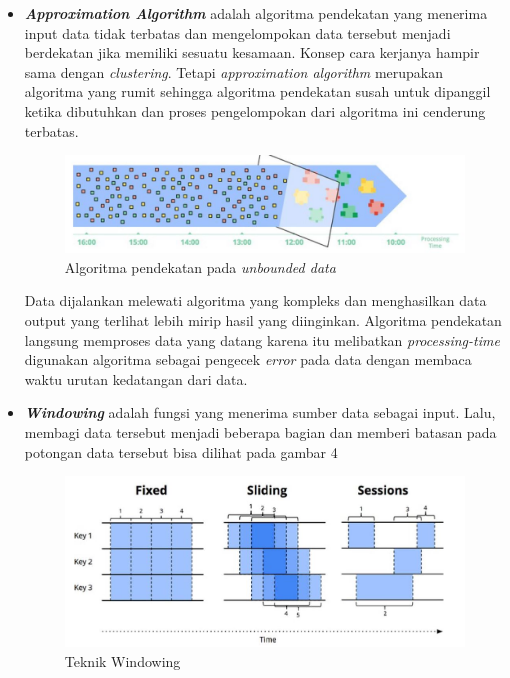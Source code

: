 \documentclass[a4paper,twoside]{article}
\begin{document}
\begin{enumerate}
\begin{itemize}
			
			\item{\textbf{\textit{Approximation Algorithm}} adalah algoritma pendekatan yang 						menerima input data tidak terbatas dan mengelompokan data tersebut menjadi berdekatan 					jika memiliki sesuatu kesamaan. Konsep cara kerjanya hampir sama dengan 								\textit{clustering}. Tetapi \textit{approximation algorithm} merupakan algoritma 						yang rumit sehingga algoritma pendekatan susah untuk dipanggil ketika dibutuhkan dan 					proses pengelompokan dari algoritma ini cenderung terbatas.
			
			\begin{figure}[H] 
			\centering  
			\includegraphics[scale=0.5]{5-approximation-algorithm}  
			\caption[Gambar {\it approximation-algorithm}]{Algoritma pendekatan pada 								\textit{unbounded data}} 
			\label{fig:processing-events relationship} 
			\end{figure} 
			
			Data dijalankan melewati algoritma yang kompleks dan menghasilkan data output yang 						terlihat lebih mirip hasil yang diinginkan. Algoritma pendekatan langsung memproses data 			yang datang karena itu melibatkan \textit{processing-time} digunakan algoritma sebagai 					pengecek \textit{error} pada data dengan membaca waktu urutan kedatangan dari data.
			}
			
			
			\item{\textbf{\textit{Windowing}} adalah fungsi yang menerima sumber data sebagai input.
			Lalu, membagi data tersebut menjadi beberapa bagian dan memberi batasan pada potongan 					data tersebut bisa dilihat pada gambar 4
			
				\begin{figure}[H] 
				\centering  
				\includegraphics[scale=0.5]{7-Windowing}  
				\caption[Gambar {\it Windowing}]{Teknik Windowing} 
				\label{fig:processing-events relationship} 
				\end{figure}
				
}
\end{itemize}
\end{enumerate}
\end{document}
